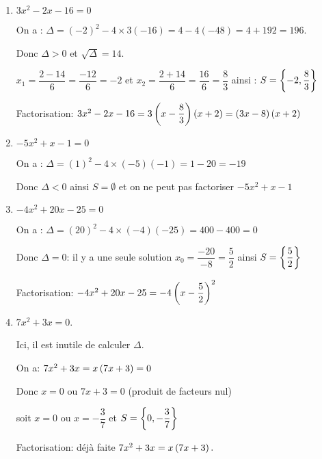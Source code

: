   \begin{enumerate}
\item $ 3x^{2}-2x-16=0 $

On a : $ \Delta=(-2)^{2}-4\times3 (-16)=4-4(-48) =4+192=196$.

Donc $ \Delta>0 $ \; et \; $\sqrt{\Delta}=14$.

$ x_{1} =\dfrac{2-14}{6}=\dfrac{-12}{6}=-2$ \;  et\;  $ x_{2} =\dfrac{2+14}{6}=\dfrac{16}{6}=\dfrac{8}{3}$  \; ainsi :\; $ S=\left\{-2,\dfrac{8}{3} \right\}$

Factorisation:\; $ 3x^{2}-2x-16=3\left(x-\dfrac{8}{3}\right)\left(x+2\right) =\left(3x-8\right)\left(x+2\right)$
 \item $ -5x^{2}+x-1=0 $
 
 On a : $ \Delta=(1)^{2}-4\times(-5)(-1)=1-20 =-19$
 
 Donc $ \Delta<0 $ \; ainsi\;  $ S=\emptyset $ et on ne peut  pas factoriser $ -5x^{2}+x-1 $
 \item $ -4x^{2}+20x-25=0 $
 
  On a : $ \Delta=(20)^{2}-4\times (-4)(-25)=400-400 =0$
  
Donc $ \Delta=0 $:\;  il y a une seule solution $ x_{0}=\dfrac{-20}{-8}=\dfrac{5}{2}$ \; ainsi \;$ S=\left\{\dfrac{5}{2} \right\}$

Factorisation:\; $ -4x^{2}+20x-25=-4\left(x-\dfrac{5}{2}\right)^{2}$
    \item $ 7x^{2}+3x=0 $.
    
    Ici, il est inutile de calculer $ \Delta $.
    
   On a:\;   $ 7x^{2}+3x=x\left(7x+3\right)=0 $
   
   Donc \; $ x=0$ \; ou \; $7x+3=0 $\; (produit de facteurs nul)
   
   soit $ x=0 $\; ou \; $ x=-\dfrac{3}{7} $ \; et\; $ S=\left\{0,-\dfrac{3}{7} \right\}$
   
   Factorisation:\;   déjà faite \;$ 7x^{2}+3x=x\left(7x+3\right).$
\end{enumerate}

 

